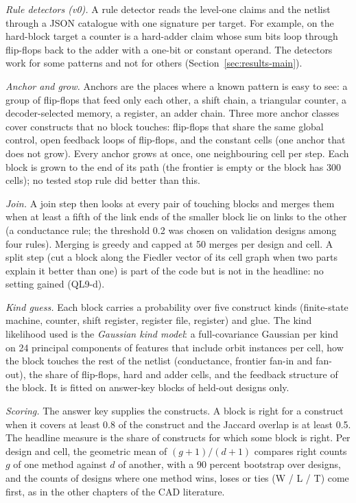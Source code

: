 \documentclass[conference]{IEEEtran}
\begin{document}
\emph{Rule detectors (v0).} A rule detector reads the level-one claims and the netlist through a
JSON catalogue with one signature per target. For example, on the hard-block target a counter is a
hard-adder claim whose sum bits loop through flip-flops back to the adder with a one-bit or
constant operand. The detectors work for some patterns and not for others (Section~\ref{sec:results-main}).

\emph{Anchor and grow.} Anchors are the places where a known pattern is easy to see: a group of
flip-flops that feed only each other, a shift chain, a triangular counter, a decoder-selected
memory, a register, an adder chain. Three more anchor classes cover constructs that no block
touches: flip-flops that share the same global control, open feedback loops of flip-flops, and the
constant cells (one anchor that does not grow). Every anchor grows at once, one neighbouring cell
per step. Each block is grown to the end of its path (the frontier is
empty or the block has 300 cells); no tested stop rule did better than this.

\emph{Join.} A join step then looks at every pair of touching blocks and merges them when at least a
fifth of the link ends of the smaller block lie on links to the other (a conductance rule; the
threshold 0.2 was chosen on validation designs among four rules). Merging is greedy and capped at
50 merges per design and cell. A split step (cut a block along the Fiedler vector of its cell graph when two
parts explain it better than one) is part of the code but is not in the headline: no setting gained
(QL9-d).

\emph{Kind guess.} Each block carries a probability over five construct kinds (finite-state machine,
counter, shift register, register file, register) and glue. The kind likelihood used is the \emph{Gaussian kind model}: a full-covariance Gaussian per kind on 24 principal components of features that include
orbit instances per cell, how the block touches the rest of the netlist (conductance, frontier
fan-in and fan-out), the share of flip-flops, hard and adder cells, and the feedback structure of
the block. It is fitted on answer-key blocks of held-out designs only.

\emph{Scoring.} The answer key supplies the constructs. A block is right for a construct when it
covers at least 0.8 of the construct and the Jaccard overlap is at least 0.5. The headline measure
is the share of constructs for which some block is right. Per design and cell, the geometric mean
of $(g+1)/(d+1)$ compares right counts $g$ of one method against $d$ of another, with a 90 percent
bootstrap over designs, and the counts of designs where one method wins, loses or ties (W / L / T)
come first, as in the other chapters of the CAD literature.
\end{document}
